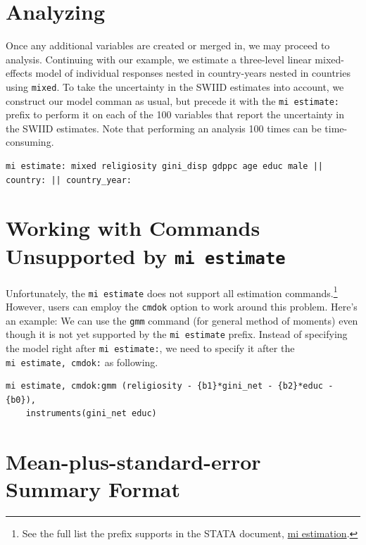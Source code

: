 \documentclass[11pt]{article}
\begin{document}
\section{Analyzing}
Once any additional variables are created or merged in, we may proceed to analysis.  Continuing with our example, we estimate a three-level linear mixed-effects model of individual responses nested in country-years nested in countries using \verb+mixed+.  To take the uncertainty in the SWIID estimates into account, we construct our model comman as usual, but precede it with the \verb+mi estimate:+ prefix to perform it on each of the 100 variables that report the uncertainty in the SWIID estimates. Note that performing an analysis 100 times can be time-consuming.

\begin{verbatim}
mi estimate: mixed religiosity gini_disp gdppc age educ male || country: || country_year:
\end{verbatim}

\section{\texorpdfstring{Working with Commands Unsupported by
\texttt{mi\ estimate}}{Working with Commands Unsupported by mi estimate}}\label{working-with-commands-unsupported-by-mi-estimate}

Unfortunately, the \texttt{mi\ estimate} does not support all estimation
commands.\footnote{See the full list the prefix supports in the STATA
  document,
  \href{http://www.stata.com/manuals14/miestimation.pdf\#miestimationDescriptionestimation_command}{mi
  estimation}.} However, users can employ the \texttt{cmdok} option to
work around this problem. Here's an example: We can use the \texttt{gmm} command (for general method of
moments) even though it is not yet supported by the
\texttt{mi\ estimate} prefix. Instead of specifying the model right
after \texttt{mi\ estimate:}, we need to specify it after the
\texttt{mi\ estimate,\ cmdok:} as following.

\begin{verbatim}
mi estimate, cmdok:gmm (religiosity - {b1}*gini_net - {b2}*educ - {b0}),
	instruments(gini_net educ)
\end{verbatim}


\section{Mean-plus-standard-error Summary Format}\label{mean-plus-standard-error-summary-format}
\end{document}
